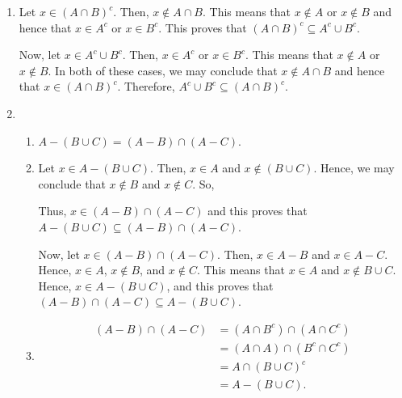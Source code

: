 \begin{enumerate}
\item Let $x \in \left( A \cap B \right)^c$.  Then, $x \notin A \cap B$.  This means that 
$x \notin A$ or $x \notin B$ and hence that $x \in A^c$ or $x \in B^c$.  This proves that 
$\left( A \cap B \right)^c \subseteq A^c \cup B^c$.

Now, let $x \in A^c \cup B^c$.  Then, $x \in A^c$ or $x \in B^c$.  This means that $x \notin A$ or 
$x \notin B$.  In both of these cases, we may conclude that $x \notin A \cap B$ and hence that 
$x \in \left( A \cap B \right)^c$.  Therefore, 
$A^c \cup B^c \subseteq \left( A \cap B \right)^c$.



\item \begin{enumerate}
\item $A - \left( {B \cup C} \right) = \left( {A - B} \right) \cap \left( {A - C} \right)$.

\item Let $x \in A - \left( {B \cup C} \right)$.  Then, $x \in A$ and $x \notin \left( B \cup C 
\right)$.  Hence, we may conclude that $x \notin B$ and $x \notin C$.  So,
Thus, $x \in \left( A - B \right) \cap \left( A - C \right)$ and this proves that 
$A - \left( {B \cup C} \right) \subseteq \left( {A - B} \right) \cap \left( {A - C} \right)$.

Now, let $x \in \left( {A - B} \right) \cap \left( {A - C} \right)$.  Then, $x \in A - B$ and 
$x \in A - C$.  Hence, $x \in A$, $x \notin B$, and $x \notin C$.  This means that 
$x \in A$ and $x \notin B \cup C$.  Hence, $x \in A - \left( B \cup C \right)$, and this proves that $\left( {A - B} \right) \cap \left( {A - C} \right) \subseteq  A - \left( B \cup C \right)$.

\item 
\[
\begin{aligned}
\left( A - B \right) \cap \left( A - C \right) &= \left( A \cap B^c \right) \cap \left( A \cap C^c \right) \\
  &= \left( A \cap A \right) \cap \left( B^c \cap C^c \right) \\
  &= A \cap \left( B \cup C \right)^c \\
  &= A - \left( B \cup C \right).
\end{aligned}
\]
\end{enumerate}




\end{enumerate}
